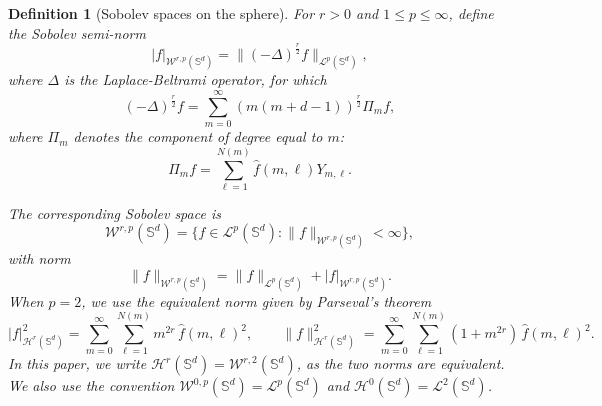 \documentclass{article}
\numberwithin{equation}{section}
\newtheorem{definition}{Definition}
\def\SS{\mathbb{S}}
\def\sul{\sum\limits}
\begin{document}
\medskip


\begin{definition}[Sobolev spaces on the sphere]\label{def:sobolev_sphere}
For $r > 0$ and $1 \le p \le \infty$, define the Sobolev semi-norm
\[
    |f|_{\mathcal{W}^{r,p}(\mathbb{S}^d)}
    = \|(-\Delta)^{\frac r2}f\|_{\mathcal{L}^p(\mathbb{S}^d)},
\]
where $\Delta$ is the Laplace-Beltrami operator, for which
\begin{equation}\label{eqn_def_Lap_Bel}
    (-\Delta)^{\frac r2}f=\sum_{m=0}^\infty (m(m+d-1))^{\frac{r}{2}}\Pi_mf,
\end{equation}
where $\Pi_m$ denotes the component of degree equal to $m$:
\begin{equation}
    \Pi_mf=\sul_{\ell=1}^{N(m)}\widehat f(m,\ell) Y_{m,\ell}.
\end{equation}

The corresponding Sobolev space is
\[
    \mathcal{W}^{r,p}(\mathbb{S}^d)
    = \{ f \in \mathcal{L}^p(\mathbb{S}^d) :
       \|f\|_{\mathcal{W}^{r,p}(\mathbb{S}^d)} < \infty \},
\]
with norm
\begin{equation}\label{eqn:sob_norm}
    \|f\|_{\mathcal{W}^{r,p}(\mathbb{S}^d)}
    = \|f\|_{\mathcal{L}^p(\mathbb{S}^d)}
      + |f|_{\mathcal{W}^{r,p}(\mathbb{S}^d)}.
\end{equation}
When $p=2$, we use the equivalent norm given by Parseval's theorem
\begin{equation}\label{eqn:Sob_norm_Parseval}
    |f|_{\mathcal{H}^r(\mathbb{S}^d)}^2
      = \sum_{m=0}^\infty \sum_{\ell=1}^{N(m)} m^{2r}\, \widehat f(m,\ell)^2,
    \qquad
    \|f\|_{\mathcal{H}^r(\mathbb{S}^d)}^2
      = \sum_{m=0}^\infty \sum_{\ell=1}^{N(m)} (1+m^{2r})\, \widehat f(m,\ell)^2.
\end{equation}
In this paper, we write $\mathcal{H}^r(\mathbb{S}^d) = \mathcal{W}^{r,2}(\mathbb{S}^d)$, as the two norms are equivalent. We also use the convention $\mathcal{W}^{0,p}(\mathbb{S}^d) = \mathcal{L}^{p}(\mathbb{S}^d)$ and $\mathcal{H}^0(\SS^d)=\mathcal{L}^{2}(\mathbb{S}^d)$.
\end{definition}


\medskip
\end{document}
